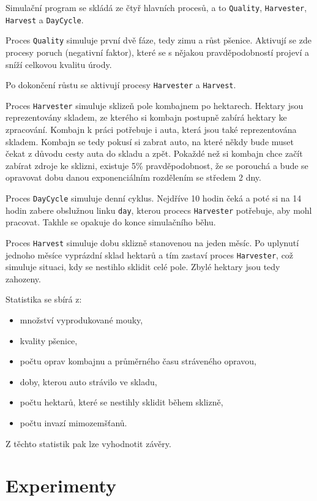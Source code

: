 \documentclass[a4paper, 11pt, hidelinks]{article}
\begin{document}
Simulační program se skládá ze čtyř hlavních procesů, a to \texttt{Quality}, \texttt{Harvester}, \texttt{Harvest} a \texttt{DayCycle}. 

Proces \texttt{Quality} simuluje první dvě fáze, tedy zimu a růst pšenice.
Aktivují se zde procesy poruch (negativní faktor), které se s nějakou pravděpodobností projeví a sníží celkovou kvalitu úrody.

Po dokončení růstu se aktivují procesy \texttt{Harvester} a \texttt{Harvest}.

Proces \texttt{Harvester} simuluje sklizeň pole kombajnem po hektarech. Hektary jsou reprezentovány skladem, ze kterého si kombajn postupně zabírá hektary ke zpracování.
Kombajn k práci potřebuje i auta, která jsou také reprezentována skladem.
Kombajn se tedy pokusí si zabrat auto, na které někdy bude muset čekat z důvodu cesty auta do skladu a zpět.
Pokaždé než si kombajn chce začít zabírat zdroje ke sklizni, existuje 5\% pravděpodobnost, že se porouchá a bude se opravovat dobu danou exponenciálním rozdělením se středem 2 dny.

Proces \texttt{DayCycle} simuluje denní cyklus. 
Nejdříve 10 hodin čeká a poté si na 14 hodin zabere obslužnou linku \texttt{day}, kterou procecs \texttt{Harvester} potřebuje, aby mohl pracovat.
Takhle se opakuje do konce simulačního běhu.

Proces \texttt{Harvest} simuluje dobu sklizně stanovenou na jeden měsíc.
Po uplynutí jednoho měsíce vyprázdní sklad hektarů a tím zastaví proces \texttt{Harvester}, což simuluje situaci, kdy se nestihlo sklidit celé pole.
Zbylé hektary jsou tedy zahozeny.

Statistika se sbírá z:
\begin{itemize}
    \item množství vyprodukované mouky,
    \item kvality pšenice,
    \item počtu oprav kombajnu a průměrného času stráveného opravou,
    \item doby, kterou auto strávilo ve skladu,
    \item počtu hektarů, které se nestihly sklidit během sklizně,
    \item počtu invazí mimozemšťanů.
\end{itemize}
Z těchto statistik pak lze vyhodnotit závěry.

\section{Experimenty}\label{4_experimenty}
\end{document}
